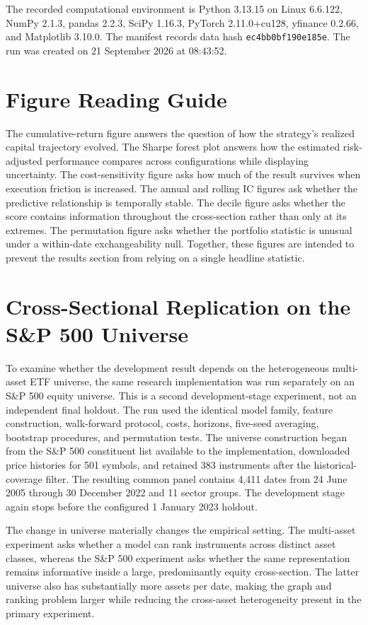 \documentclass[10pt]{article}
\begin{document}
The recorded computational environment is Python 3.13.15 on Linux 6.6.122, NumPy 2.1.3, pandas 2.2.3, SciPy 1.16.3, PyTorch 2.11.0+cu128, yfinance 0.2.66, and Matplotlib 3.10.0. The manifest records data hash \texttt{ec4bb0bf190e185e}. The run was created on 21 September 2026 at 08:43:52.

\section{Figure Reading Guide}

The cumulative-return figure answers the question of how the strategy's realized capital trajectory evolved. The Sharpe forest plot answers how the estimated risk-adjusted performance compares across configurations while displaying uncertainty. The cost-sensitivity figure asks how much of the result survives when execution friction is increased. The annual and rolling IC figures ask whether the predictive relationship is temporally stable. The decile figure asks whether the score contains information throughout the cross-section rather than only at its extremes. The permutation figure asks whether the portfolio statistic is unusual under a within-date exchangeability null. Together, these figures are intended to prevent the results section from relying on a single headline statistic.

\clearpage
\section{Cross-Sectional Replication on the S\&P 500 Universe}

To examine whether the development result depends on the heterogeneous multi-asset ETF universe, the same research implementation was run separately on an S\&P 500 equity universe. This is a second development-stage experiment, not an independent final holdout. The run used the identical model family, feature construction, walk-forward protocol, costs, horizons, five-seed averaging, bootstrap procedures, and permutation tests. The universe construction began from the S\&P 500 constituent list available to the implementation, downloaded price histories for 501 symbols, and retained 383 instruments after the historical-coverage filter. The resulting common panel contains 4,411 dates from 24 June 2005 through 30 December 2022 and 11 sector groups. The development stage again stops before the configured 1 January 2023 holdout.

The change in universe materially changes the empirical setting. The multi-asset experiment asks whether a model can rank instruments across distinct asset classes, whereas the S\&P 500 experiment asks whether the same representation remains informative inside a large, predominantly equity cross-section. The latter universe also has substantially more assets per date, making the graph and ranking problem larger while reducing the cross-asset heterogeneity present in the primary experiment.
\end{document}

